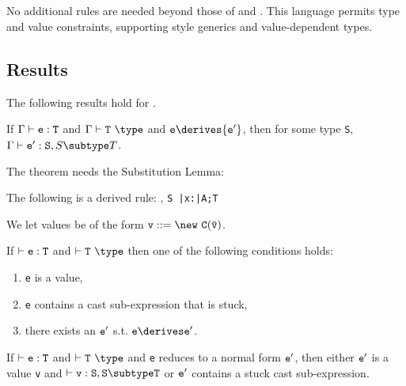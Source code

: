 \subsection{\FXGD} 

No additional rules are needed beyond those of \FXG{} and \FXD{}. This
language permits type and value constraints, supporting \FGJ{} style
generics and value-dependent types.


\subsection{Results}
The following results hold for \FXGD.

\begin{theorem} If $\Gamma \vdash {\tt e:T}$
and $\Gamma \vdash {\tt T}~\type$ and ${\tt e} \derives {\tt e'}$, then
for some type {\tt S}, $\Gamma \vdash {\tt e':S},{S \subtype T}$.
\end{theorem}

The theorem needs the Substitution Lemma:
\begin{lemma} The following is a derived rule:
{\Gamma {}, {\tt S \subtype \bar{\tt x}:\bar{\tt A};T}}
\end{lemma}

We let values be of the form $\tt v ::= \new\ C(\bar{\tt v})$. 
\begin{theorem}[Progress]
If $\vdash {\tt e:T}$ and $\vdash {\tt T}~\type$
then one of the following conditions holds:
\begin{enumerate}
\item {\tt e} is a value,
\item {\tt e} contains a cast sub-expression that is stuck,
\item there exists an $\tt e'$ s.t. $\tt e\derives e'$.
\end{enumerate}
\end{theorem}

\begin{theorem}
If $\vdash {\tt e:T}$ and $\vdash {\tt T}~\type$ and {\tt e}
reduces to a normal form ${\tt e'}$, then
either $\tt e'$ is a value {\tt v} and $\vdash {\tt v:S},{\tt S\subtype T}$ or
${\tt e'}$ contains  a stuck cast sub-expression.
\end{theorem}







